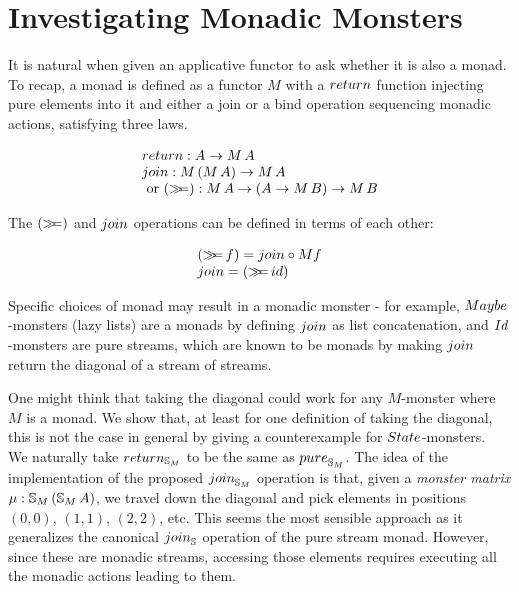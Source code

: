 \section{Investigating Monadic Monsters}\label{sec:monad}

It is natural when given an applicative functor to ask whether it is also a monad.\\

To recap, a monad is defined as a functor $M$ with a $\return$ function injecting pure elements into it and either a join or a bind operation sequencing monadic actions, satisfying three laws.

$$
\begin{array}{l}
\return : A \rightarrow M\, A \\
\join : M\,(M\, A) \rightarrow M\, A\\
\mbox{ or }
(\bind) : M\, A \rightarrow (A \rightarrow M\, B) \rightarrow M\, B
\end{array}
$$

The $(\mathbin{\gg\!\!=})$ and $\join$ operations can be defined in terms of each other:

$$
\begin{array}{l}
(\bind\, f) = \join \comp M f \\
\join = (\bind\,\id)
\end{array}
$$

Specific choices of monad may result in a monadic monster - for example, $\maybe$-monsters (lazy lists) are a monads by defining $\join$ as list concatenation, and $\Id$-monsters are pure streams, which are known to be monads by making $\join$ return the diagonal of a stream of streams.

One might think that taking the diagonal could work for any $M$-monster where $M$ is a monad. We show that, at least for one definition of taking the diagonal, this is not the case in general by giving a counterexample for $\state$-monsters.\\

We naturally take $\return_{\stream{M}}$ to be the same as $\apure_{\stream{M}}$.
The idea of the implementation of the proposed $\join_{\stream{M}}$ operation is that,
given a {\em monster matrix} $\mu:\mathbb{S}_{M}\,(\mathbb{S}_{M}\,A)$, we travel down the diagonal and pick elements in positions $(0,0)$, $(1,1)$, $(2,2)$, etc.
This seems the most sensible approach as it generalizes the canonical $\join_\strsym$ operation of the pure stream monad.
However, since these are monadic streams, accessing those elements requires executing all the monadic actions leading to them.

